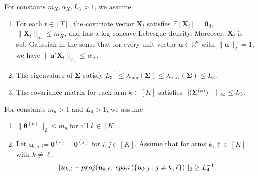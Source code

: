 \documentclass[10pt,a4paper]{amsart}
\newcommand{\Exp}{\mathbb{E}}
\newcommand{\bR}{\mathbb{R}}
\newcommand{\bSigma}{\boldsymbol{\Sigma}}
\newcommand{\bX}{\boldsymbol{X}}
\newcommand{\bd}[1]{\boldsymbol{#1}}
\newcommand{\btheta}{\boldsymbol{\theta}}
\newcommand{\bu}{\boldsymbol{u}}
\newcommand{\lmax}[1]{\lambda_{\max}\left(#1\right)}
\newcommand{\lmin}[1]{\lambda_{\min}\left(#1\right)}
\newcommand{\mn}{\vert\kern-0.25ex \vert\kern-0.25ex \vert}
\begin{document}
\begin{assumption}\label{assumption: covariates_bandit}
For constants $m_X, \alpha_X, L_3>1$,  we assume
\begin{enumerate}[label={(\alph*)}, ref={\theassumption\ (\alph*)}]
\item \label{assumption: context}
For each $t \in [T]$, the covariate vector $\bX_t$ satisfies $\Exp[\bX_t] = \bd{0}_d$, $\|\bX_t\|_{\infty} \leq m_X$, and has a log-concave Lebesgue-density. Moreover, $\bX_t$ is sub-Gaussian in the sense that for every unit vector $\bu \in \bR^d$ with $\|\bu\|_2 = 1$, we have $\|\bu' \bX_t\|_{\psi_2} \leq \alpha_X$.

 
 
 \item \label{assumption: bounded cov mat}
The eigenvalues of $\bSigma$ satisfy $L_3^{-1}\le \lmin{\bSigma}\le \lmax{\bSigma} \le L_3$.
\item \label{assumption: constraint on the covariance matrix 1}
The covariance matrix for each arm $k\in[K]$ satisfies $\mn(\bSigma^{(k)})^{-1}\mn_{\infty} \le L_3$. 
\end{enumerate}    
\end{assumption}

\begin{assumption} \label{assumption:arm_parameters}
For constants $m_{\theta} > 1$ and $L_4 > 1$, we assume
\begin{enumerate}[label={(\alph*)}, ref={\theassumption\ (\alph*)}]
\item \label{assumption: theta_bound}
$\|\btheta^{(k)}\|_2\le m_{\theta}$ for all $k\in [K]$.

\item \label{assumption: linear_independent}
Let $\bu_{i,j} := \btheta^{(i)}-\btheta^{(j)}$ for $i,j\in[K]$. Assume that for arms $k,\ell \in [K]$ with $k \neq \ell$, 
$$
\|\bu_{k,\ell}-\textup{proj}(\bu_{k,\ell};\;\textup{span}\left(\{\bu_{k,j}:j\neq k,\ell\}\right)\|_2\ge L_4^{-1}.
$$
\end{enumerate}
\end{assumption}
\end{document}
